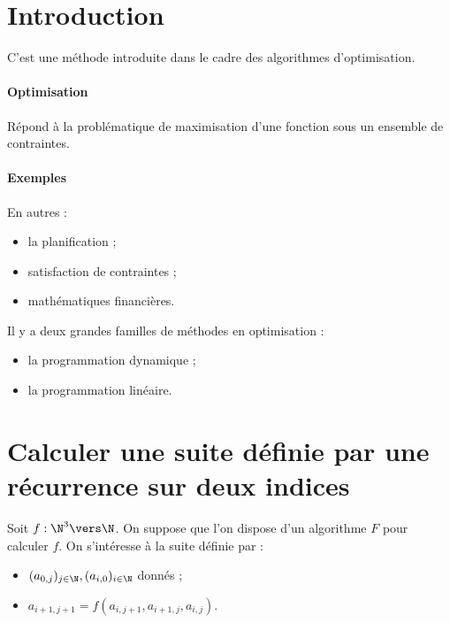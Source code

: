 \documentclass{mybourbaki}
\begin{document}
\section*{Introduction}
C'est une méthode introduite dans le cadre des algorithmes d'optimisation.

\paragraph{Optimisation}Répond à la problématique de maximisation d'une fonction sous un ensemble de contraintes.

\paragraph{Exemples}En autres :
\begin{itemize}
\item la planification ;
\item satisfaction de contraintes ;
\item mathématiques financières.
\end{itemize}

Il y a deux grandes familles de méthodes en optimisation :
\begin{itemize}
\item la programmation dynamique ;
\item la programmation linéaire.
\end{itemize}

\section{Calculer une suite définie par une récurrence sur deux indices}

Soit $f:\N^{3}\vers \N$. On suppose que l'on dispose d'un algorithme $F$ pour calculer $f$.
On s'intéresse à la suite définie par : 
\begin{itemize}
\item $(a_{0,j})_{j\in \N}, (a_{i,0})_{i\in \N}$ donnés ;
\item $a_{i+1,j+1} = f(a_{i,j+1},a_{i+1,j},a_{i,j})$.
\end{itemize}
\end{document}
